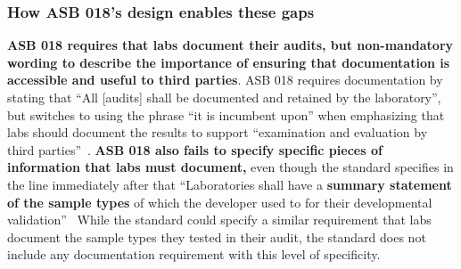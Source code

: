 \subsubsection{How ASB 018's design enables these gaps}
\label{sec:communication-design}
\textbf{ASB 018 requires that labs document their audits, but non-mandatory wording to describe the importance of ensuring that documentation is accessible and useful to third parties}. ASB 018 requires documentation by stating that ``All [audits] shall be documented and retained by the laboratory'', but switches to using the phrase ``it is incumbent upon'' when emphasizing that labs should document the results to support ``examination and evaluation by third parties''~\cite[Annex A R4.5]{asb018}. \textbf{ASB 018 also fails to specify specific pieces of information that labs must document,} even though the standard specifies in the line immediately after that ``Laboratories shall have a \textbf{summary statement of the sample types} of which the developer used to for their developmental validation''~\cite[Annex A R4.5]{asb018} While the standard could specify a similar requirement that labs document the sample types they tested in their audit, the standard does not include any documentation requirement with this level of specificity. 
